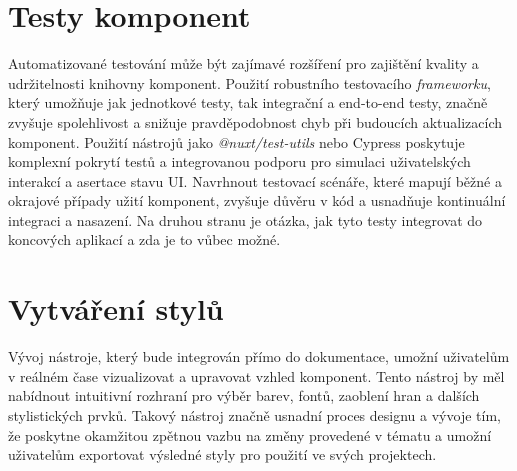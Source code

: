 \section{Testy komponent}
Automatizované testování může být zajímavé rozšíření pro zajištění kvality a udržitelnosti knihovny komponent. Použití robustního testovacího \emph{frameworku}, který umožňuje jak jednotkové testy, tak integrační a end-to-end testy, značně zvyšuje spolehlivost a snižuje pravděpodobnost chyb při budoucích aktualizacích komponent. Použití nástrojů jako \emph{@nuxt/test-utils} nebo Cypress poskytuje komplexní pokrytí testů a integrovanou podporu pro simulaci uživatelských interakcí a asertace stavu UI. Navrhnout testovací scénáře, které mapují běžné a okrajové případy užití komponent, zvyšuje důvěru v kód a usnadňuje kontinuální integraci a nasazení. Na druhou stranu je otázka, jak tyto testy integrovat do koncových aplikací a zda je to vůbec možné.

\section{Vytváření stylů}
Vývoj  nástroje, který bude integrován přímo do dokumentace, umožní uživatelům v reálném čase vizualizovat a upravovat vzhled komponent. Tento nástroj by měl nabídnout intuitivní rozhraní pro výběr barev, fontů, zaoblení hran a dalších stylistických prvků. Takový nástroj značně usnadní proces designu a vývoje tím, že poskytne okamžitou zpětnou vazbu na změny provedené v tématu a umožní uživatelům exportovat výsledné styly pro použití ve svých projektech.
